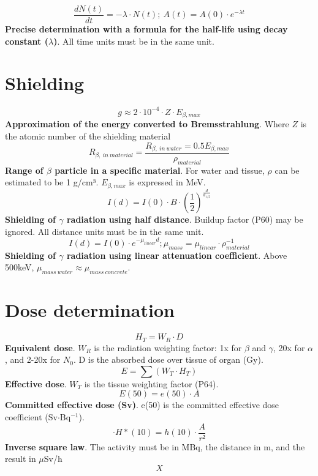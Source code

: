 \[\frac{dN(t)}{dt}=-\lambda\cdot N(t);\ A(t) = A(0)\cdot e^{-\lambda t}\]
\textbf{Precise determination with a formula for the half-life using decay constant ($\lambda$)}. All time units must be in the same unit.\\

\section{Shielding}
\[g \approx 2\cdot10^{-4}\cdot Z\cdot E_{\beta,max}\]
\textbf{Approximation of the energy converted to Bremsstrahlung}. Where $Z$ is the atomic number of the shielding material\\
\[R_{\beta,\ in\ material} = \frac{R_{\beta,\ in\ water} = 0.5 E_{\beta,max}}{\rho_{material}}\]
\textbf{Range of $\beta$ particle in a specific material}. For water and tissue, $\rho$ can be estimated to be 1 g/cm³. $E_{\beta,max}$ is expressed in MeV.\\
\[I(d) = I(0)\cdot B\cdot(\frac{1}{2})^{\frac{d}{d_{1/2}}}\]
\textbf{Shielding of $\gamma$ radiation using half distance}. Buildup factor (P60) may be ignored. All distance units must be in the same unit.\\
\[I(d) = I(0)\cdot e^{-\mu_{linear} d}; \mu_{mass} = \mu_{linear}\cdot\rho_{material}^{-1}\]
\textbf{Shielding of $\gamma$ radiation using linear attenuation coefficient}. Above 500keV, $\mu_{mass\ water}\approx\mu_{mass\ concrete}$.\\

\section{Dose determination}
\[H_T = W_R \cdot D\]
\textbf{Equivalent dose}. $W_R$ is the radiation weighting factor: 1x for $\beta$ and $\gamma$, 20x for $\alpha$, and 2-20x for $N_0$. D is the absorbed dose over tissue of organ (Gy).\\
\[E = \sum (W_T \cdot H_T)\]
\textbf{Effective dose}. $W_T$ is the tissue weighting factor (P64). \\
\[E(50) = e(50)\cdot A\]
\textbf{Committed effective dose (Sv)}. e(50) is the committed effective dose coefficient (Sv$\cdot$Bq$^{-1}$).\\
\[\cdot H*(10) = h(10)\cdot\frac{A}{r²}\]
\textbf{Inverse square law}. The activity must be in MBq, the distance in m, and the result in $\mu$Sv/h\\
\[X\]
\textbf{}\\


